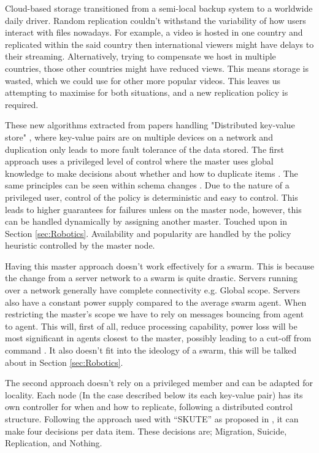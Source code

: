 \documentclass{UoYCSproject}
\begin{document}
Cloud-based storage transitioned from a semi-local backup system to a worldwide daily driver.
Random replication couldn’t withstand the variability of how users interact with files nowadays.
For example, a video is hosted in one country and replicated within the said country then international viewers might have delays to their streaming.
Alternatively, trying to compensate we host in multiple countries, those other countries might have reduced views.
This means storage is wasted, which we could use for other more popular videos.
This leaves us attempting to maximise for both situations, and a new replication policy is required.

These new algorithms extracted from papers handling "Distributed key-value store" \cite{Key-Value}, where key-value pairs are on multiple devices on a network and duplication only leads to more fault tolerance of the data stored.
The first approach uses a privileged level of control where the master uses global knowledge to make decisions about whether and how to duplicate items \cite{Avalability storage, Patent}.
The same principles can be seen within schema changes \cite{Scheme changes}.
Due to the nature of a privileged user, control of the policy is deterministic and easy to control.
This leads to higher guarantees for failures unless on the master node, however, this can be handled dynamically by assigning another master.
Touched upon in Section \ref{sec:Robotics}.
Availability and popularity are handled by the policy heuristic controlled by the master node.

Having this master approach doesn’t work effectively for a swarm.
This is because the change from a server network to a swarm is quite drastic.
Servers running over a network generally have complete connectivity e.g. Global scope.
Servers also have a constant power supply compared to the average swarm agent.
When restricting the master's scope we have to rely on messages bouncing from agent to agent.
This will, first of all, reduce processing capability, power loss will be most significant in agents closest to the master, possibly leading to a cut-off from command \cite{Swarm robotics reviewed}.
It also doesn’t fit into the ideology of a swarm, this will be talked about in Section \ref{sec:Robotics}.

The second approach doesn’t rely on a privileged member and can be adapted for locality.
Each node (In the case described below its each key-value pair) has its own controller for when and how to replicate, following a distributed control structure.
Following the approach used with “SKUTE” as proposed in \cite{Distributed Storage}, it can make four decisions per data item.
These decisions are; Migration, Suicide, Replication, and Nothing.
\end{document}
